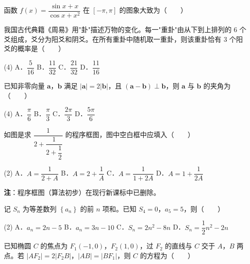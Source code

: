 函数 $f(x)=\dfrac{\sin x+x}{\cos x+x^{2}}$ 在 $[-\pi,\pi]$ 的图象大致为（　　）

\begin{center}\end{center}

我国古代典籍《周易》用"卦"描述万物的变化。每一"重卦"由从下到上排列的 $6$ 个爻组成，爻分为阳爻和阴爻。在所有重卦中随机取一重卦，则该重卦恰有 $3$ 个阳爻的概率是（　　）

\begin{gkopts}(4)
\task A．$\dfrac5{16}$
\task B．$\dfrac{11}{32}$
\task C．$\dfrac{21}{32}$
\task D．$\dfrac{11}{16}$
\end{gkopts}

已知非零向量 $\boldsymbol a$，$\boldsymbol b$ 满足 $|\boldsymbol a|=2|\boldsymbol b|$，且 $(\boldsymbol a-\boldsymbol b)\perp\boldsymbol b$，则 $\boldsymbol a$ 与 $\boldsymbol b$ 的夹角为（　　）

\begin{gkopts}(4)
\task A．$\dfrac\pi6$
\task B．$\dfrac\pi3$
\task C．$\dfrac{2\pi}3$
\task D．$\dfrac{5\pi}6$
\end{gkopts}

如图是求 $\dfrac1{2+\dfrac1{2+\dfrac12}}$ 的程序框图，图中空白框中应填入（　　）

\begin{center}\end{center}

\begin{gkopts}(2)
\task A．$A=\dfrac1{2+A}$
\task B．$A=2+\dfrac1A$
\task C．$A=\dfrac1{1+2A}$
\task D．$A=1+\dfrac1{2A}$
\end{gkopts}

\begin{gktip}
\textbf{注}：程序框图（算法初步）在现行新课标中已删除。
\end{gktip}

记 $S_n$ 为等差数列 $\left\{a_n\right\}$ 的前 $n$ 项和。已知 $S_4=0$，$a_5=5$，则（　　）

\begin{gkopts}(2)
\task A．$a_n=2n-5$
\task B．$a_n=3n-10$
\task C．$S_n=2n^{2}-8n$
\task D．$S_n=\dfrac12n^{2}-2n$
\end{gkopts}

已知椭圆 $C$ 的焦点为 $F_1(-1,0)$，$F_2(1,0)$，过 $F_2$ 的直线与 $C$ 交于 $A$，$B$ 两点。若 $\left|AF_2\right|=2\left|F_2B\right|$，$|AB|=\left|BF_1\right|$，则 $C$ 的方程为（　　）

